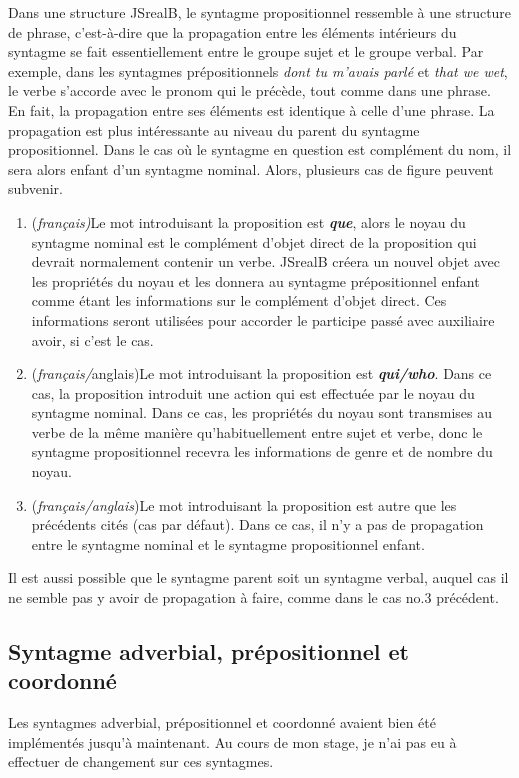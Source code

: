 \documentclass[11pt]{article} %
\newcommand{\system}[1]{\textsf{#1}}
\newcommand{\JSB}{\system{JSrealB}}
\begin{document}
Dans une structure \JSB{}, le syntagme propositionnel ressemble à
une structure de phrase, c'est-à-dire que la propagation entre les
éléments intérieurs du syntagme se fait essentiellement entre le groupe
sujet et le groupe verbal. Par exemple, dans les syntagmes prépositionnels
\emph{dont tu m'avais parlé }et \emph{that we wet}, le verbe s'accorde
avec le pronom qui le précède, tout comme dans une phrase. En fait,
la propagation entre ses éléments est identique à celle d'une phrase.
La propagation est plus intéressante au niveau du parent du syntagme
propositionnel. Dans le cas où le syntagme en question est complément
du nom, il sera alors enfant d'un syntagme nominal. Alors, plusieurs
cas de figure peuvent subvenir. 
\begin{enumerate}
\item (\emph{français)}Le mot introduisant la proposition est \textbf{\emph{que}},
alors le noyau du syntagme nominal est le complément d'objet direct
de la proposition qui devrait normalement contenir un verbe. \JSB{}
créera un nouvel objet avec les propriétés du noyau et les donnera
au syntagme prépositionnel enfant comme étant les informations sur
le complément d'objet direct. Ces informations seront utilisées pour
accorder le participe passé avec auxiliaire avoir, si c'est le cas.
\item (\emph{français/}anglais)Le mot introduisant la proposition est \textbf{\emph{qui/who}}.
Dans ce cas, la proposition introduit une action qui est effectuée
par le noyau du syntagme nominal. Dans ce cas, les propriétés du noyau
sont transmises au verbe de la même manière qu'habituellement entre
sujet et verbe, donc le syntagme propositionnel recevra les informations
de genre et de nombre du noyau.
\item (\emph{français/anglais})Le mot introduisant la proposition est autre
que les précédents cités (cas par défaut). Dans ce cas, il n'y a pas
de propagation entre le syntagme nominal et le syntagme propositionnel
enfant. 
\end{enumerate}
Il est aussi possible que le syntagme parent soit un syntagme verbal,
auquel cas il ne semble pas y avoir de propagation à faire, comme
dans le cas no.3 précédent.

\subsection{Syntagme adverbial, prépositionnel et coordonné}

Les syntagmes adverbial, prépositionnel et coordonné avaient bien
été implémentés jusqu'à maintenant. Au cours de mon stage, je n'ai
pas eu à effectuer de changement sur ces syntagmes.
\end{document}
